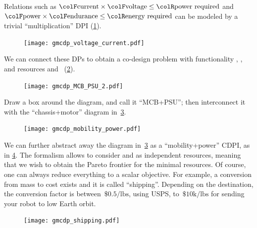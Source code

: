\begin{example}
Relations such as ${\colF\mbox{current}}\times{\colF\mbox{voltage}}\leq{\colR\mbox{power required}}$
and ${\colF\mbox{power}}\times{\colF\mbox{endurance}}\leq{\colR\mbox{energy required}}$
can be modeled by a trivial ``multiplication'' DPI (\cref{fig:current_times_voltage}).

\begin{figure}[h]
    \centering
    \texttt{[image: gmcdp\_voltage\_current.pdf]}
    \caption{\label{fig:current_times_voltage}}
\end{figure}


We can connect these DPs to obtain a co-design problem with
functionality , ,  and resources
 and ~(\cref{fig:connect}).

\begin{figure}[h]
    \centering
    \texttt{[image: gmcdp\_MCB\_PSU\_2.pdf]}
    \caption{\label{fig:connect}}
\end{figure}


Draw a box around the diagram, and call it ``MCB+PSU'';
then interconnect it with the ``chassis+motor'' diagram in~\cref{fig:another}.

 
\begin{figure}[h]
\begin{centering}
\texttt{[image: gmcdp\_mobility\_power.pdf]}
\par\end{centering}
\caption{\label{fig:another}}
\end{figure}

We can further abstract away the diagram in~\cref{fig:another} as
a ``mobility+power'' CDPI, as in \cref{fig:shipping}. The formalism
allows to consider  and  as independent resources,
meaning that we wish to obtain the Pareto frontier for the minimal
resources. Of course, one can always reduce everything to a scalar
objective. For example, a conversion from mass to cost exists and
it is called ``shipping''. Depending on the destination, the conversion
factor is between~$\$0.5/\mbox{lbs}$, using USPS, to~$\$10\mbox{k}/\mbox{lbs}$
for sending your robot to low Earth orbit. 


\begin{figure}[h]
\centering{}\texttt{[image: gmcdp\_shipping.pdf]}\caption{\label{fig:shipping}}
\end{figure}

\end{example}



